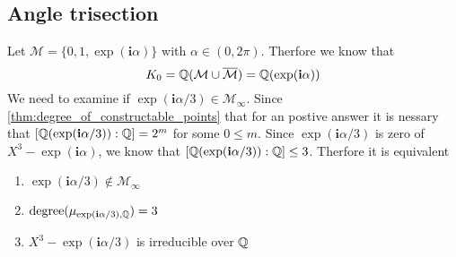 \documentclass{../Proof_layout_PDF/TemplateExercise}
\begin{document}
\subsection{Angle trisection}
Let $\mathcal{M} = \{0,1,\exp(\textbf{i} \alpha)\}$ with $\alpha \in (0,2\pi)$. Therfore we know that
\begin{equation*}
    K_0 = \mathbb{Q}(\mathcal{M}\cup \overline{\mathcal{M}}) = \mathbb{Q}(\exp(\textbf{i} \alpha))
\end{equation*}
We need to examine if $\exp(\textbf{i} \alpha/3) \in \mathcal{M}_{\infty}$. Since \ref{thm:degree_of_constructable_points}
that for an postive answer it is nessary that $[\mathbb{Q}(\exp(\textbf{i} \alpha/3)):\mathbb{Q}] = 2^m$ for some $0 \le m $. \newline
Since $\exp(\textbf{i} \alpha/3)$ is zero of $X^3 - \exp(\textbf{i} \alpha)$, we know that $[\mathbb{Q}(\exp(\textbf{i} \alpha/3)):\mathbb{Q}] \le 3$.
Therfore it is equivalent
\begin{enumerate}
    \item $\exp(\textbf{i} \alpha/3) \notin \mathcal{M}_{\infty}$
    \item $\text{degree}(\mu_{\exp(\textbf{i} \alpha/3),\mathbb{Q}}) = 3$
    \item $X^3 - \exp(\textbf{i} \alpha/3)$ is irreducible over $\mathbb{Q}$
\end{enumerate}
\end{document}
